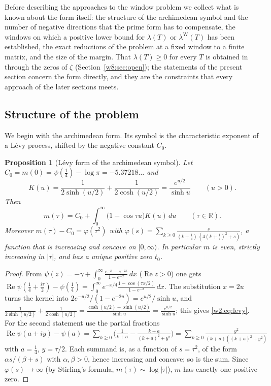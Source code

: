 \documentclass[11pt]{amsart}
\newtheorem{proposition}[theorem]{Proposition}
\theoremstyle{definition}
\theoremstyle{remark}
\numberwithin{equation}{section}
\newcommand{\R}{\mathbb{R}}
\DeclareMathOperator{\Rel}{Re}
\newcommand{\lam}{\lambda(T)}                          %
\newcommand{\lamW}{\lambda^{\mathrm W}(T)}             %
\begin{document}
Before describing the approaches to the window problem we collect what is known about the form itself: the structure of
the archimedean symbol and the number of negative directions that the prime form has to compensate, the windows on which
a positive lower bound for $\lam$ or $\lamW$ has been established, the exact reductions of the problem at a fixed window
to a finite matrix, and the size of the margin. That $\lam\ge0$ for every $T$ is obtained in
\cite[Corollary~16.3]{P46} through the zeros of $\zeta$ (Section~\ref{w8:sec:open}); the statements of the present
section concern the form directly, and they are the constraints that every approach of the later sections meets.

\subsection{Structure of the problem}

We begin with the archimedean form. Its symbol is the characteristic exponent of a L\'evy process, shifted by the
negative constant $C_0$.

\begin{proposition}[L\'evy form of the archimedean symbol]\label{w2:prop:levy}
Let $C_0=m(0)=\psi(\frac14)-\log\pi=-5.37218\ldots$ and
\[
K(u)=\frac{1}{2\sinh(u/2)}+\frac{1}{2\cosh(u/2)}=\frac{e^{u/2}}{\sinh u}\qquad(u>0).
\]
Then
\begin{equation}\label{w2:eq:levy}
m(\tau)=C_0+\int_0^\infty\bigl(1-\cos\tau u\bigr)K(u)\,du\qquad(\tau\in\R).
\end{equation}
Moreover $m(\tau)-C_0=\varphi(\tau^2)$ with
$\varphi(s)=\sum_{k\ge0}\frac{s}{(k+\frac14)\,(4(k+\frac14)^2+s)}$, a function that is increasing and concave on
$[0,\infty)$. In particular $m$ is even, strictly increasing in $|\tau|$, and has a unique positive zero $t_0$.
\end{proposition}

\begin{proof}
From $\psi(z)=-\gamma+\int_0^\infty\frac{e^{-x}-e^{-zx}}{1-e^{-x}}\,dx$ ($\Rel z>0$) one gets
$\Rel\psi(\frac14+\frac{i\tau}2)-\psi(\frac14)=\int_0^\infty e^{-x/4}\frac{1-\cos(\tau x/2)}{1-e^{-x}}\,dx$. The
substitution $x=2u$ turns the kernel into $2e^{-u/2}/(1-e^{-2u})=e^{u/2}/\sinh u$, and
$\frac{1}{2\sinh(u/2)}+\frac1{2\cosh(u/2)}=\frac{\cosh(u/2)+\sinh(u/2)}{\sinh u}=\frac{e^{u/2}}{\sinh u}$; this gives
\eqref{w2:eq:levy}. For the second statement use the partial fractions
$\Rel\psi(a+iy)-\psi(a)=\sum_{k\ge0}\bigl(\frac1{k+a}-\frac{k+a}{(k+a)^2+y^2}\bigr)
=\sum_{k\ge0}\frac{y^2}{(k+a)((k+a)^2+y^2)}$ with $a=\frac14$, $y=\tau/2$. Each summand is, as a function of
$s=\tau^2$, of the form $\alpha s/(\beta+s)$ with $\alpha,\beta>0$, hence increasing and concave; so is the sum.
Since $\varphi(s)\to\infty$ (by Stirling's formula, $m(\tau)\sim\log|\tau|$), $m$ has exactly one positive zero.
\end{proof}
\end{document}
